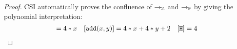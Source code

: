    

    
    
    
    
    
\begin{lemma}[Confluence]
\begin{proof}
CSI automatically proves the confluence of $\rightarrow_\mathbb{Z}$ and $\rightarrow_\mathbb{P}$ by giving the polynomial interpretation:
\begin{align*}
[\tt{succ}(x)] = 4*x & &[\tt{add}(x, y)] = 4 * x + 4 * y + 2  & &[{\tt{H}}] = 4 \\
\end{align*}
\end{proof} 
\end{lemma}